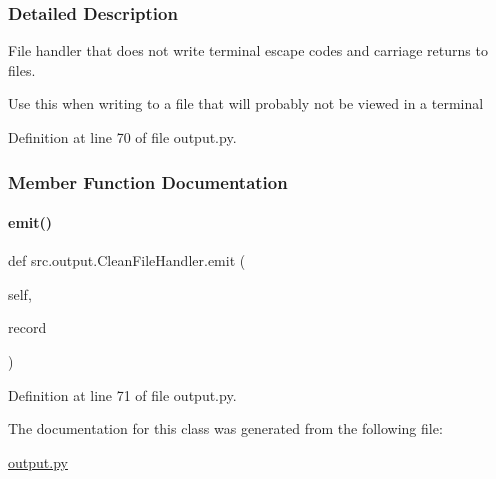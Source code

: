 \subsubsection{Detailed Description}
File handler that does not write terminal escape codes and carriage returns to files. 

Use this when writing to a file that will probably not be viewed in a terminal 

Definition at line 70 of file output.\+py.



\subsubsection{Member Function Documentation}
\mbox{\label{classsrc_1_1output_1_1CleanFileHandler_a5160ea5727832e846f4033f084b753e4}} 
\paragraph{\texorpdfstring{emit()}{emit()}}
{\footnotesize\ttfamily def src.\+output.\+Clean\+File\+Handler.\+emit (\begin{DoxyParamCaption}\item[{}]{self,  }\item[{}]{record }\end{DoxyParamCaption})}



Definition at line 71 of file output.\+py.



The documentation for this class was generated from the following file\+:\begin{DoxyCompactItemize}
\item 
\hyperlink{output_8py}{output.\+py}\end{DoxyCompactItemize}
